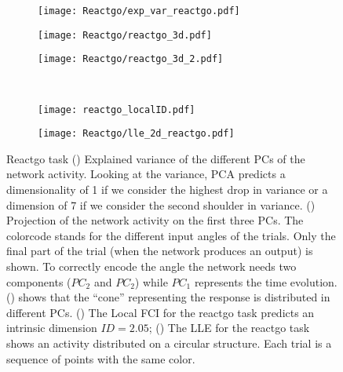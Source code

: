 \documentclass[11pt,a4paper]{article}
\begin{document}
\begin{figure}
 \centering
 \begin{subfigure}[b]{0.25\textwidth}
   \centering
   \texttt{[image: Reactgo/exp\_var\_reactgo.pdf]}
   \subcaption{}\label{fig:Reactgo:exp_var_reactgo}
 \end{subfigure}
 \begin{subfigure}[b]{0.30\textwidth}
   \centering
   \texttt{[image: Reactgo/reactgo\_3d.pdf]}
   \subcaption{}\label{fig:Reactgo:reactgo_3d}
 \end{subfigure}
 \begin{subfigure}[b]{0.40\textwidth}
   \centering
   \texttt{[image: Reactgo/reactgo\_3d\_2.pdf]}
   \subcaption{}\label{fig:Reactgo:reactgo_3d_2}
 \end{subfigure}\\
  \begin{subfigure}[b]{0.45\textwidth}
    \centering
    \texttt{[image: reactgo\_localID.pdf]}
   \subcaption{}\label{fig:Reactgo:hist2D_reactgo_localFCI}
  \end{subfigure}
 \begin{subfigure}[b]{0.45\textwidth}
    \centering
    \texttt{[image: Reactgo/lle\_2d\_reactgo.pdf]}
   \subcaption{}\label{fig:Reactgo:lle_2d_reactgo}
  \end{subfigure}
 \caption{Reactgo task
  () Explained variance of the different PCs of the network activity.
  Looking at the variance, PCA predicts a dimensionality of 1 if we consider the highest drop in  variance  or a dimension of 7 if we consider the second shoulder in variance. 
  () Projection of the network activity on the first three PCs. The colorcode stands for the different input angles of the trials.
   Only the final part of the trial (when the network produces an output) is shown.
  To correctly encode the angle the network needs two components ($PC_2$ and $PC_2$) while $PC_1$ represents the time evolution.
  () shows that the ``cone'' representing the response is distributed in different PCs.
  () The Local FCI for the reactgo task predicts an intrinsic dimension $ID=2.05$;
  () The LLE for the reactgo task shows an activity distributed on a circular structure. 
  Each trial is a sequence of points with the same color.
   }\label{fig:Reactgo}
\end{figure}
\end{document}
